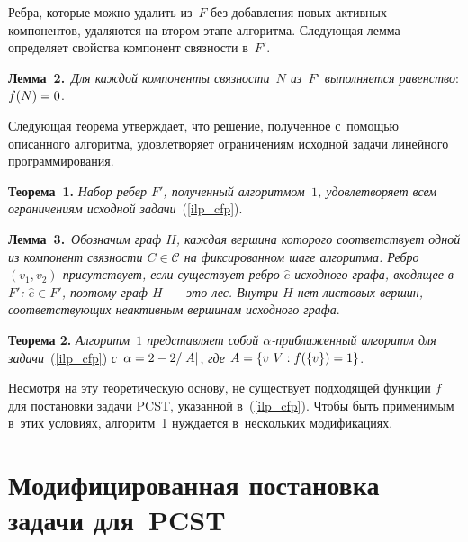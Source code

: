 \begin{multicols}{2}
Ребра, которые можно удалить из~$F$ без добавления новых активных компонентов, 
удаляются на втором этапе алгоритма. Следующая лемма определяет свойства 
компонент связ\-ности в~$F'$.


\smallskip

\noindent
\textbf{Лемма~2.}\
\textit{Для каждой компоненты связ\-ности~$N$ из~$F'$ выполняется равенство}: $f(N)\hm=0$.

\smallskip

Следующая теорема утверж\-да\-ет, что решение, полученное с~помощью описанного 
алгоритма, удовле\-тво\-ря\-ет ограничениям исходной задачи линейного 
программирования.

\smallskip

\noindent
\textbf{Теорема~1.}
\textit{Набор ребер $F'$, полученный алгоритмом~$1$, удовлетворяет всем 
ограничениям исходной задачи}~(\ref{ilp_cfp}).


\smallskip

\noindent
\textbf{Лемма~3.}\
\textit{Обозначим граф $H$, каждая вершина которого соответствует одной из компонент 
связ\-ности $C\in\mathcal{C}$ на фиксированном шаге алгоритма. Ребро $(v_1,v_2)$ 
присутствует, если существует ребро $\hat{e}$ исходного графа, входящее в~$F'$: 
$\hat{e} \in F'$, поэтому граф $H$~--- это лес. Внут\-ри $H$ нет листовых вершин, 
со\-от\-вет\-ст\-ву\-ющих неактивным вершинам исходного графа}.

\smallskip

\noindent
\textbf{Теорема 2.}
\textit{Алгоритм~$1$ представляет собой $\alpha$-при\-бли\-жен\-ный алгоритм для 
задачи}~(\ref{ilp_cfp}) \textit{с}~$\alpha \hm= 2 - {2}/{|A|}$, \textit{где} $A\hm=\{v\  V: 
f(\{v\})=1\}$.

\smallskip

Несмотря на эту теоретическую основу, не существует подходящей функции $f$ для 
постановки задачи PCST, указанной в~(\ref{ilp_cfp}). Чтобы быть 
применимым в~этих условиях, алгоритм~1 нуждается в~нескольких 
модификациях.

\vspace*{-9pt}

\section{Модифицированная постановка задачи для~PCST}

\vspace*{-3pt}


\end{multicols}
